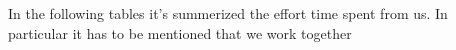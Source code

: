 In the following tables it's summerized the effort time spent from us. In particular it has to be mentioned that we work together 
\begin{comment}		
	\begin{longtable}{| p{5 cm} | p{2 cm} |} 
			\hline
			{\bf Task} & {\bf Hours}\\
			\hline
            Git setup & 2 \\
			Pre-analysis & 2 \\
			Complete Part 1 and organize following work & 2 \\
			Product Functionalities and User Characteristics& 2 \\
			Software, Hardware, Communication Interfaces & 1 \\
			User Interfaces & 2 \\
			Use Cases & 3 \\
			Latex setup & 2 \\
			Review Meeting & 3 \\
			Use Case Diagrams, Scenarios & 1,5\\
			Track4Run Use Cases & 2 \\
			Goals, Requirements and Domain Assumptions Revision & 3 \\
			Copy on Latex & 5 \\
			Final Revision & 3 \\
			\hline
			&  {\bf Total} \\
			\hline
			&  35,5 \\
			\hline
			\caption{Matteo Bresciani's effort}
		\end{longtable}
	
			\begin{longtable}{| p{5 cm} | p{2 cm} |} 
			\hline
			{\bf Task} & {\bf Hours}\\
			\hline
            Git setup & 2 \\
			Pre-analysis & 2 \\
			Complete Part 1 and organize following work & 2 \\
			Product Functionalities and User Characteristics& 2 \\
			Software, Hardware, Communication Interfaces & 1 \\
			User Interfaces & 2 \\
			Use Cases & 3 \\
			Latex setup & 2 \\
			Review Meeting & 3 \\
			Use Case Diagrams, Scenarios & 1,5\\
			Track4Run Use Cases & 2 \\
			Goals, Requirements and Domain Assumptions Revision & 3 \\
			Copy on Latex & 5 \\
			Final Revision & 3 \\
			\hline
			&  {\bf Total} \\
			\hline
			&  35,5 \\
			\hline
			\caption{Stafano Banfi's effort}
		\end{longtable}
	\end{comment}
	